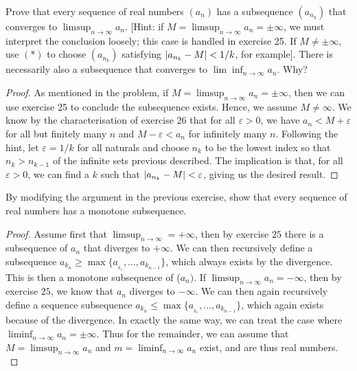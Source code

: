 \begin{exercise}{27}
Prove that every sequence of real numbers $(a_n)$ has a subsequence $(a_{n_k})$ that converges to $\limsup_{n\to\infty}a_n$. [Hint: if $M=\limsup_{n\to\infty}a_n=\pm\infty$, we must interpret the conclusion loosely; this case is handled in exercise 25. If $M\neq\pm\infty$, use $(\ast)$ to choose $(a_{n_k})$ satisfying $\left\lvert a_{n_k}-M\right\rvert<1/k$, for example]. There is necessarily also a subsequence that converges to $\lim\inf_{n\to\infty}a_n$. Why?
\end{exercise}
\begin{proof}
As mentioned in the problem, if $M=\limsup_{n\to\infty}a_n=\pm\infty$, then we can use exercise 25 to conclude the subsequence exists. Hence, we assume $M\neq\infty$. We know by the characterisation of exercise 26 that for all $\varepsilon>0$, we have $a_n<M+\varepsilon$ for all but finitely many $n$ and $M-\varepsilon<a_n$ for infinitely many $n$. Following the hint, let $\varepsilon=1/k$ for all naturals and choose $n_k$ to be the lowest index so that $n_k>n_{k-1}$ of the infinite sets previous described. The implication is that, for all $\varepsilon>0$, we can find a $k$ such that $\left\lvert a_{n_k}-M\right\rvert<\varepsilon$, giving us the desired result.
\end{proof}

\begin{exercise}{28}
By modifying the argument in the previous exercise, show that every sequence of real numbers has a monotone subsequence.
\end{exercise}
\begin{proof}
    Assume first that $\limsup_{n\rightarrow \infty} = +\infty$, then by exercise $25$ there is a subsequence of $a_n$ that diverges to $+\infty$. We can then recursively define a subsequence $a_{k_n}\geq \max\{a__{k_1},...,a_{k_{n-1}}\}$, which always exists by the divergence. This is then a monotone subsequence of ($a_n)$. If $\limsup_{n\rightarrow \infty} a_n = -\infty$, then by exercise $25$, we know that $a_n$ diverges to $-\infty$. We can then again recursively define a sequence subsequence $a_{k_n}\leq \max\{a__{k_1},...,a_{k_{n-1}}\}$, which again exists because of the divergence. In exactly the same way, we can treat the case where $\liminf_{n\rightarrow \infty} a_n = \pm\infty$. Thus for the remainder, we can assume that $M = \limsup_{n\rightarrow \infty} a_n$ and $m = \liminf_{n\rightarrow \infty} a_n$ exist, and are thus real numbers.\\

    
\end{proof}

